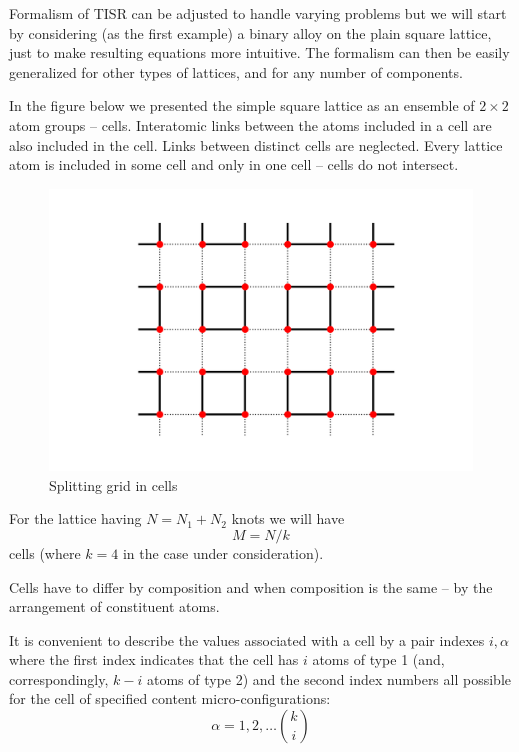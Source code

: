 \documentclass[12pt,abstract]{scrartcl}
\begin{document}
Formalism of TISR  can be adjusted to handle varying problems  but  we will start by considering (as the first example)  a  binary alloy on the plain square lattice, just  to make resulting equations more intuitive. The formalism can then be easily generalized  for other types of lattices, and for any number of components. 

In the figure below we presented the simple square lattice as an ensemble of \(2 \times 2\) atom groups -- cells.
  Interatomic links between the  atoms included in a cell are also included in the cell.  Links between distinct cells are neglected. Every lattice atom is included in some cell  and only in one cell -- cells do not intersect.


\begin{figure}[ht]
\includegraphics[scale=0.5]{Splitting_the_grid.png}
\centering 
\caption{Splitting grid in cells}
\label{fig:Splitting}
\end{figure}

For the lattice having \(N = N_1 + N_2\) knots   we will have
\[M = N / k \]
 cells (where \(k = 4\) in the  case under consideration).
 
 

Cells have to differ  by composition  and when composition  is the same -- by the arrangement of constituent atoms.

It is convenient to describe the values associated with a cell by a pair indexes \( i, \alpha \) where the first index 
indicates that the cell has \( i \) atoms of type 1 (and, correspondingly, \( k - i \) atoms of type 2) and the second index numbers all possible for the cell of specified content 
micro-configurations:
\[ \alpha = 1, 2, \dots \binom{k}{i} \]
\end{document}
